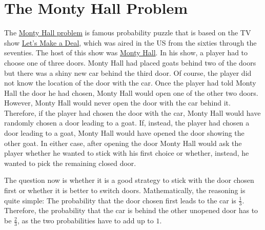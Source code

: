 \section{The Monty Hall Problem}
The \href{http://en.wikipedia.org/wiki/Monty_Hall_problem}{Monty Hall problem} is famous probability
puzzle that is based on the TV show 
\href{http://en.wikipedia.org/wiki/Let%27s_Make_a_Deal}{Let's Make a Deal}, which was aired in the
US from the sixties through the seventies.  The host of this show was 
\href{http://en.wikipedia.org/wiki/Monty_Hall}{Monty Hall}. In his show, a player had to choose one
of three doors.  Monty Hall had placed goats behind two of the doors but there was a shiny new car
behind the third door.  Of course, the player did not know the location of the door with the car.  
Once the player had told Monty Hall the door he had chosen, Monty Hall would open one of the other
two doors.  However, Monty Hall would never open the door with the car behind it.  Therefore, if the
player had chosen the door with the car, Monty Hall would have randomly chosen a door leading to a
goat.  If, instead, the player had chosen a door leading to a goat, Monty Hall would have opened the
door showing the other goat.  In either case, after opening the door  Monty Hall would ask the
player whether he wanted to stick with his first choice or whether, instead, he wanted to pick the
remaining closed door.  

The question now is whether it is a good strategy to stick with the door chosen first or whether it
is better to switch doors.  Mathematically, the reasoning is quite simple: The probability that the
door chosen first leads to the car is $\frac{1}{3}$.  Therefore, the probability that the car is behind
the other unopened door has to be $\frac{2}{3}$, as the two probabilities have to add up to $1$.  

